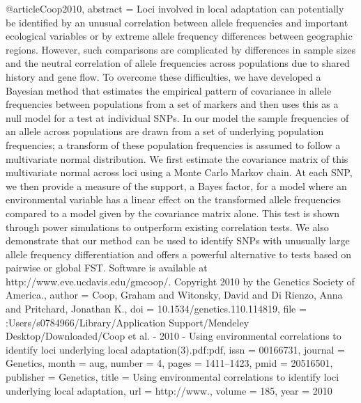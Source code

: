 @article{Coop2010,
abstract = {Loci involved in local adaptation can potentially be identified by an unusual correlation between allele frequencies and important ecological variables or by extreme allele frequency differences between geographic regions. However, such comparisons are complicated by differences in sample sizes and the neutral correlation of allele frequencies across populations due to shared history and gene flow. To overcome these difficulties, we have developed a Bayesian method that estimates the empirical pattern of covariance in allele frequencies between populations from a set of markers and then uses this as a null model for a test at individual SNPs. In our model the sample frequencies of an allele across populations are drawn from a set of underlying population frequencies; a transform of these population frequencies is assumed to follow a multivariate normal distribution. We first estimate the covariance matrix of this multivariate normal across loci using a Monte Carlo Markov chain. At each SNP, we then provide a measure of the support, a Bayes factor, for a model where an environmental variable has a linear effect on the transformed allele frequencies compared to a model given by the covariance matrix alone. This test is shown through power simulations to outperform existing correlation tests. We also demonstrate that our method can be used to identify SNPs with unusually large allele frequency differentiation and offers a powerful alternative to tests based on pairwise or global FST. Software is available at http://www.eve.ucdavis.edu/gmcoop/. Copyright {\textcopyright} 2010 by the Genetics Society of America.},
author = {Coop, Graham and Witonsky, David and {Di Rienzo}, Anna and Pritchard, Jonathan K.},
doi = {10.1534/genetics.110.114819},
file = {:Users/s0784966/Library/Application Support/Mendeley Desktop/Downloaded/Coop et al. - 2010 - Using environmental correlations to identify loci underlying local adaptation(3).pdf:pdf},
issn = {00166731},
journal = {Genetics},
month = {aug},
number = {4},
pages = {1411--1423},
pmid = {20516501},
publisher = {Genetics},
title = {{Using environmental correlations to identify loci underlying local adaptation}},
url = {http://www.},
volume = {185},
year = {2010}
}
